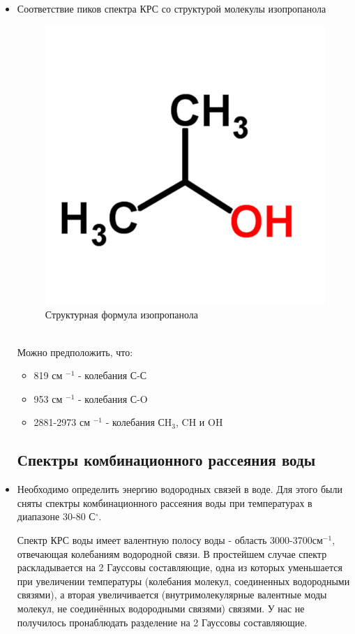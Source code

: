 \documentclass[a4paper,12pt]{article} %
\begin{document}
\begin{itemize}
\item Соответствие пиков спектра КРС со структурой молекулы изопропанола 
\begin{figure}[h!] \label{fig4}
    \centering
    \includegraphics[scale = 0.2]{izopropanol.png}
    \caption{\centering Структурная формула изопропанола}
\end{figure}\\
Можно предположить, что:
\begin{itemize}
    \item 819 см $^{-1}$ - колебания С-С
    \item 953 см $^{-1}$ - колебания С-O
    \item 2881-2973 см $^{-1}$ - колебания СH$_3$, CH и OH
\end{itemize}
\newpage
\subsection{Спектры комбинационного рассеяния воды}
\item Необходимо определить энергию водородных связей в воде. Для этого были сняты спектры комбинационного рассеяния воды при температурах в диапазоне 30-80 С$^\circ$.     

Спектр КРС воды имеет валентную полосу воды - область 3000-3700см$^{-1}$, отвечающая колебаниям водородной связи. В простейшем случае спектр раскладывается на 2 Гауссовы составляющие, одна из которых уменьшается при увеличении температуры (колебания молекул, соединенных водородными связями), а вторая увеличивается (внутримолекулярные валентные моды молекул, не соединённых водородными связями)
связями. У нас не получилось пронаблюдать разделение на 2 Гауссовы составляющие.
\begin{figure}[h!]


\end{figure}
\end{itemize}
\end{document}
